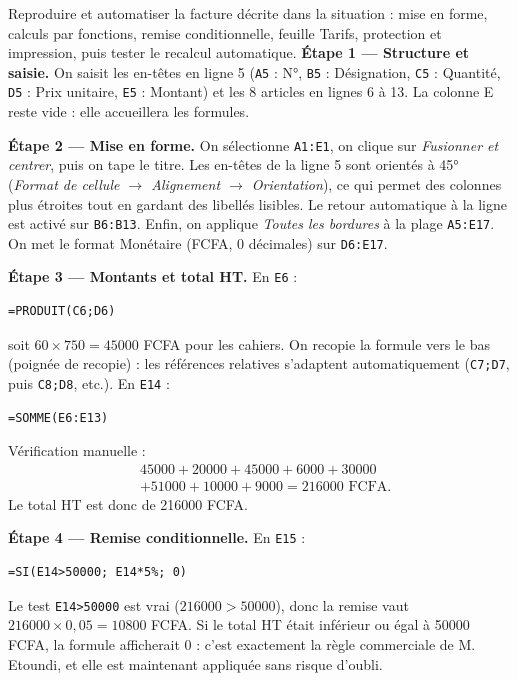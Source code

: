 \documentclass[11pt]{article}
\begin{document}
\begin{exoresolu}
Reproduire et automatiser la facture décrite dans la situation : mise en forme, calculs par fonctions, remise conditionnelle, feuille Tarifs, protection et impression, puis tester le recalcul automatique.
\tcblower
\textbf{Étape 1 — Structure et saisie.} On saisit les en-têtes en ligne 5 (\texttt{A5} : N°, \texttt{B5} : Désignation, \texttt{C5} : Quantité, \texttt{D5} : Prix unitaire, \texttt{E5} : Montant) et les 8 articles en lignes 6 à 13. La colonne E reste vide : elle accueillera les formules.

\textbf{Étape 2 — Mise en forme.} On sélectionne \texttt{A1:E1}, on clique sur \emph{Fusionner et centrer}, puis on tape le titre. Les en-têtes de la ligne 5 sont orientés à 45° (\emph{Format de cellule $\to$ Alignement $\to$ Orientation}), ce qui permet des colonnes plus étroites tout en gardant des libellés lisibles. Le retour automatique à la ligne est activé sur \texttt{B6:B13}. Enfin, on applique \emph{Toutes les bordures} à la plage \texttt{A5:E17}. On met le format Monétaire (FCFA, 0 décimales) sur \texttt{D6:E17}.

\textbf{Étape 3 — Montants et total HT.} En \texttt{E6} :
\begin{lstlisting}
=PRODUIT(C6;D6)
\end{lstlisting}
soit $60 \times 750 = \num{45000}$ FCFA pour les cahiers. On recopie la formule vers le bas (poignée de recopie) : les références relatives s'adaptent automatiquement (\texttt{C7;D7}, puis \texttt{C8;D8}, etc.). En \texttt{E14} :
\begin{lstlisting}
=SOMME(E6:E13)
\end{lstlisting}
Vérification manuelle :
\begin{align*}
&\num{45000} + \num{20000} + \num{45000} + \num{6000} + \num{30000} \\
&+ \num{51000} + \num{10000} + \num{9000} = \num{216000} \text{ FCFA}.
\end{align*}
Le total HT est donc de \num{216000} FCFA.

\textbf{Étape 4 — Remise conditionnelle.} En \texttt{E15} :
\begin{lstlisting}
=SI(E14>50000; E14*5%; 0)
\end{lstlisting}
Le test \texttt{E14>50000} est vrai ($\num{216000} > \num{50000}$), donc la remise vaut $\num{216000} \times 0{,}05 = \num{10800}$ FCFA. Si le total HT était inférieur ou égal à \num{50000} FCFA, la formule afficherait 0 : c'est exactement la règle commerciale de M. Etoundi, et elle est maintenant appliquée sans risque d'oubli.


\end{exoresolu}
\end{document}
